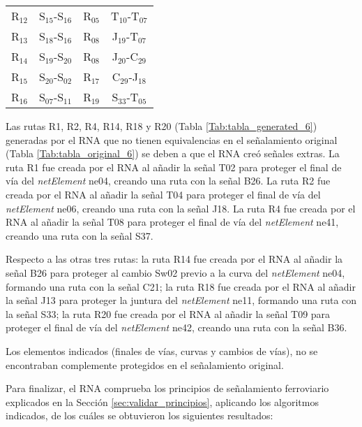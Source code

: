 \begin{table}[H]
{\begin{center}
{\begin{tabular}{ c c c c }
                    R$_{12}$ & S$_{15}$-S$_{16}$ & R$_{05}$ & T$_{10}$-T$_{07}$ \\
                    R$_{13}$ & S$_{18}$-S$_{16}$ & R$_{08}$ & J$_{19}$-T$_{07}$ \\
                    R$_{14}$ & S$_{19}$-S$_{20}$ & R$_{08}$ & J$_{20}$-C$_{29}$ \\
                    R$_{15}$ & S$_{20}$-S$_{02}$ & R$_{17}$ & C$_{29}$-J$_{18}$ \\
                    R$_{16}$ & S$_{07}$-S$_{11}$ & R$_{19}$ & S$_{33}$-T$_{05}$ \\
                \hline
            \end{tabular}
            }
            \end{center}
        }    
    \end{table}
    
    Las rutas R1, R2, R4, R14, R18 y R20 (Tabla \ref{Tab:tabla_generated_6}) generadas por el RNA que no tienen equivalencias en el señalamiento original (Tabla \ref{Tab:tabla_original_6}) se deben a que el RNA creó señales extras. La ruta R1 fue creada por el RNA al añadir la señal T02 para proteger el final de vía del \textit{netElement} ne04, creando una ruta con la señal B26. La ruta R2 fue creada por el RNA al añadir la señal T04 para proteger el final de vía del \textit{netElement} ne06, creando una ruta con la señal J18. La ruta R4 fue creada por el RNA al añadir la señal T08 para proteger el final de vía del \textit{netElement} ne41, creando una ruta con la señal S37.
    
    Respecto a las otras tres rutas: la ruta R14 fue creada por el RNA al añadir la señal B26 para proteger al cambio Sw02 previo a la curva del \textit{netElement} ne04, formando una ruta con la señal C21; la ruta R18 fue creada por el RNA al añadir la señal J13 para proteger la juntura  del \textit{netElement} ne11, formando una ruta con la señal S33; la ruta R20 fue creada por el RNA al añadir la señal T09 para proteger el final de vía del \textit{netElement} ne42, creando una ruta con la señal B36.
    
    Los elementos indicados (finales de vías, curvas y cambios de vías), no se encontraban complemente protegidos en el señalamiento original.
    
    Para finalizar, el RNA comprueba los principios de señalamiento ferroviario explicados en la Sección \ref{sec:validar_principios}, aplicando los algoritmos indicados, de los cuáles se obtuvieron los siguientes resultados:
    
